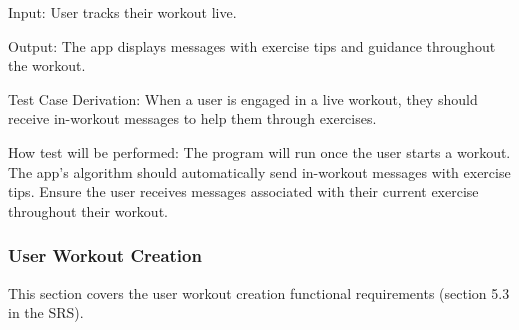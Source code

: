 \documentclass[12pt, titlepage]{article}
\begin{document}
\begin{enumerate}
Input: User tracks their workout live.

Output: The app displays messages with exercise tips and guidance throughout the workout.

Test Case Derivation: When a user is engaged in a live workout, they should receive in-workout messages to help them through exercises.

How test will be performed: The program will run once the user starts a workout. The app’s algorithm should automatically send in-workout messages with exercise tips. Ensure the user receives messages associated with their current exercise throughout their workout.
 
\end{enumerate}

\subsubsection{User Workout Creation}
This section covers the user workout creation functional requirements (section 5.3 in the SRS).
\end{document}
